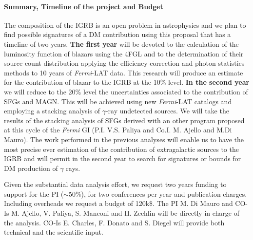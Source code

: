 \documentclass[12 pt]{article}
\newcommand{\FIXME}[1]{{\color{red}{\em Comment: }{#1}}}
\begin{document}
\paragraph{Summary, Timeline of the project and Budget}
The composition of the IGRB is an open problem in astrophysics and we plan to find possible signatures of a DM contribution using this proposal that has a timeline of two years.  
{\bf The first year} will be devoted to the calculation of the luminosity function of blazars using the 4FGL and to the determination of their source count distribution applying the efficiency correction and photon statistics methods to 10 years of {\it Fermi}-LAT data. This research will produce an estimate for the contribution of blazar to the IGRB at the 10\% level.
{\bf In the second year} we will reduce to the 20\% level the uncertainties associated to the contribution of SFGs and MAGN. This will be achieved using new {\it Fermi}-LAT catalogs and employing a stacking analysis of $\gamma$-ray undetected sources.
We will take the results of the stacking analysis of SFGs derived with an other program proposed at this cycle of the {\it Fermi} GI (P.I. V.S. Paliya and Co.I. M. Ajello and M.Di Mauro).
The work performed in the previous analyses will enable us to have the most precise ever estimation of the contribution of extragalactic sources to the IGRB and will permit in the second year to search for signatures or bounds for DM production of $\gamma$ rays.

Given the substantial data analysis effort, we request two years funding to support for the PI ($\sim 50\%$), for two conferences per year and publication charges. Including overheads we request a budget of 120k\$. \FIXME{Is that total, or per year?} The PI M. Di Mauro and CO-Is M. Ajello, V. Paliya, S. Manconi and H. Zechlin will be directly in charge of the analysis. CO-Is E. Charles, F. Donato and S. Diegel will provide both technical and the scientific input.



\vspace{-0.0cm}
{\footnotesize
\begin{multicols}{2}


\end{multicols}}
\end{document}
